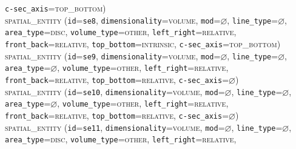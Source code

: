 \documentclass[11pt]{article}
\begin{document}
{            \texttt{c-sec\_axis}=\textsc{top\_bottom})\vspace{0.5em}\\
        \textsc{spatial\_entity}
            (\texttt{id}=\texttt{se8},
            \texttt{dimensionality}=\textsc{volume},
            \texttt{mod}=$\varnothing$,
            \texttt{line\_type}=$\varnothing$,\\
            \texttt{area\_type}=\textsc{disc},
            \texttt{volume\_type}=\textsc{other},
            \texttt{left\_right}=\textsc{relative},\\
            \texttt{front\_back}=\textsc{relative},
            \texttt{top\_bottom}=\textsc{intrinsic},
            \texttt{c-sec\_axis}=\textsc{top\_bottom})\vspace{0.5em}\\
        \textsc{spatial\_entity}
            (\texttt{id}=\texttt{se9},
            \texttt{dimensionality}=\textsc{volume},
            \texttt{mod}=$\varnothing$,
            \texttt{line\_type}=$\varnothing$,\\
            \texttt{area\_type}=$\varnothing$,
            \texttt{volume\_type}=\textsc{other},
            \texttt{left\_right}=\textsc{relative},\\
            \texttt{front\_back}=\textsc{relative},
            \texttt{top\_bottom}=\textsc{relative},
            \texttt{c-sec\_axis}=$\varnothing$)\vspace{0.5em}\\
        \textsc{spatial\_entity}
            (\texttt{id}=\texttt{se10},
            \texttt{dimensionality}=\textsc{volume},
            \texttt{mod}=$\varnothing$,
            \texttt{line\_type}=$\varnothing$,\\
            \texttt{area\_type}=$\varnothing$,
            \texttt{volume\_type}=\textsc{other},
            \texttt{left\_right}=\textsc{relative},\\
            \texttt{front\_back}=\textsc{relative},
            \texttt{top\_bottom}=\textsc{relative},
            \texttt{c-sec\_axis}=$\varnothing$)\vspace{0.5em}\\
        \textsc{spatial\_entity}
            (\texttt{id}=\texttt{se11},
            \texttt{dimensionality}=\textsc{volume},
            \texttt{mod}=$\varnothing$,
            \texttt{line\_type}=$\varnothing$,\\
            \texttt{area\_type}=\textsc{disc},
            \texttt{volume\_type}=\textsc{other},
            \texttt{left\_right}=\textsc{relative},\\
}
\end{document}
